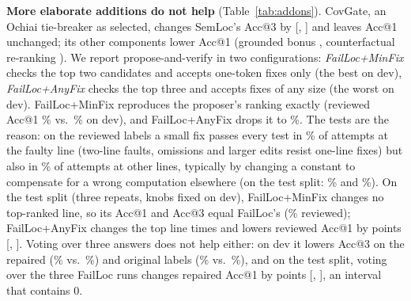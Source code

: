 \textbf{More elaborate additions do not help} (Table~\ref{tab:addons}). CovGate, an Ochiai tie-breaker as selected,
changes SemLoc's Acc@3 by \RqTwoRepairedAllCovgateDAccThree{} [\RqTwoRepairedAllCovgateDAccThreeLo,
\RqTwoRepairedAllCovgateDAccThreeHi] and leaves Acc@1 unchanged; its other components lower Acc@1 (grounded bonus
\RqTwoRepairedAllGroundedPriorOnlyDAccOne, counterfactual re-ranking \RqTwoRepairedAllCfRerankDAccOne). We report
propose-and-verify in two configurations: \emph{FailLoc+MinFix} checks the top two candidates and accepts one-token
fixes only (the best on dev), \emph{FailLoc+AnyFix} checks the top three and accepts fixes of any size (the worst on
dev). FailLoc+MinFix reproduces the proposer's ranking exactly (reviewed Acc@1 \PavDevChosenReviewedAccOne\% vs.\
\PavDevStageReviewedAccOne\% on dev), and FailLoc+AnyFix drops it to \PavDevWorstReviewedAccOne\%. The tests are the reason: on the reviewed labels a small fix passes every test in
\PavmechReviewedFaultLineFixable\% of attempts at the faulty line (two-line faults, omissions and larger edits resist
one-line fixes) but also in \PavmechReviewedOtherLineFixable\% of attempts at other lines, typically by changing a
constant to compensate for a wrong computation elsewhere (on the test split: \PavmechtestReviewedFaultLineFixable\% and
\PavmechtestReviewedOtherLineFixable\%). On the test split (three repeats, knobs fixed on dev), FailLoc+MinFix
changes no top-ranked line, so its Acc@1 and Acc@3 equal FailLoc's (\PavtestChosenReviewedPavAccOne\% reviewed);
FailLoc+AnyFix changes the top line \PavtestWorstReviewedTopOneChanged{} times and lowers reviewed Acc@1 by
\PavtestWorstReviewedDAccOne{} points [\PavtestWorstReviewedDAccOneLo, \PavtestWorstReviewedDAccOneHi]. Voting over three answers does not help either: on dev it lowers Acc@3 on the repaired
(\VoteRepairedVoteAccThree\% vs.\ \VoteRepairedSingleAccThree\%) and original labels (\VoteOriginalVoteAccThree\% vs.\
\VoteOriginalSingleAccThree\%), and on the test split, voting over the three FailLoc runs changes repaired Acc@1 by
\VotetestRepairedDAccOne{} points [\VotetestRepairedDAccOneLo, \VotetestRepairedDAccOneHi], an interval that contains 0.

\begin{table}[!t]
\centering
\caption{Additions compared with the method they extend: $\Delta$ in points (test rows: three repeats with
\ConstCiLevel\% cluster-bootstrap CIs on the test split; FailLoc+MinFix is FailLoc+Verify with knobs selected on the dev split)}
\label{tab:addons}
\resizebox{0.85\textwidth}{!}{}
\end{table}


